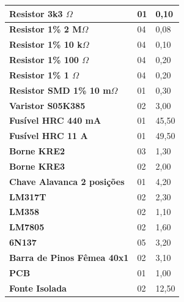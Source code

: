 \begin{table}[!ht]
\begin{tabular}{|l|l|l|}
        \textbf{Resistor 3k3 $\Omega$}         & 01                  & 0,10                             \\ \hline
        \textbf{Resistor 1\% 2 M$\Omega$}      & 04                  & 0,08                             \\ \hline
        \textbf{Resistor 1\% 10 k$\Omega$}     & 04                  & 0,10                             \\ \hline
        \textbf{Resistor 1\% 100 $\Omega$}     & 04                  & 0,20                             \\ \hline
        \textbf{Resistor 1\% 1 $\Omega$}       & 04                  & 0,20                             \\ \hline
        \textbf{Resistor SMD 1\% 10 m$\Omega$} & 01                  & 0,30                             \\ \hline
        \textbf{Varistor S05K385}              & 02                  & 3,00                             \\ \hline
        \textbf{Fusível HRC 440 mA}            & 01                  & 45,50                            \\ \hline
        \textbf{Fusível HRC 11 A}              & 01                  & 49,50                            \\ \hline
        \textbf{Borne KRE2}                    & 03                  & 1,30                             \\ \hline
        \textbf{Borne KRE3}                    & 02                  & 2,00                             \\ \hline
        \textbf{Chave Alavanca 2 posições}     & 01                  & 4,20                             \\ \hline
        \textbf{LM317T}                        & 02                  & 2,30                             \\ \hline
        \textbf{LM358}                         & 02                  & 1,10                             \\ \hline
        \textbf{LM7805}                        & 02                  & 1,60                             \\ \hline
        \textbf{6N137}                         & 05                  & 3,20                             \\ \hline
        \textbf{Barra de Pinos Fêmea 40x1}     & 02                  & 3,10                             \\ \hline
        \textbf{PCB}                           & 01                  & 1,00                             \\ \hline
        \textbf{Fonte Isolada}                 & 02                  & 12,50                            \\ \hline
    \end{tabular}
\end{table}

